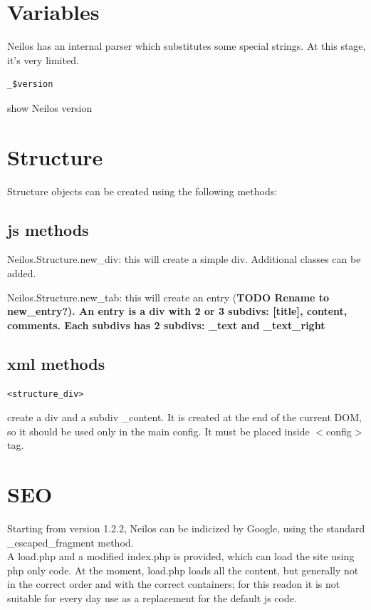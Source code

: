 \documentclass[a4paper,12pt]{article}
\begin{document}
\section{Variables}
Neilos has an internal parser which substitutes some special strings. At this stage, it's very limited.
\begin{list}{-}{}
\item \begin{verbatim}
_$version
\end{verbatim}
show Neilos version
\end{list}
\normalsize
\section{Structure}
Structure objects can be created using the following methods:
\subsection{js methods}
\begin{list}{-}{}
 \item Neilos.Structure.new\_div: this will create a simple div. Additional classes can be added.
\item Neilos.Structure.new\_tab: this will create an entry (\bfseries{TODO} \normalfont Rename to new\_entry?). An entry is a div with 2 or 3 subdivs: [title], content, comments. Each subdivs has 2 subdivs: \_text and \_text\_right
\end{list}
\subsection{xml methods}
\begin{list}{-}{}
  \item \begin{verbatim}
<structure_div>         
        \end{verbatim}
create a div and a subdiv \_content. It is created at the end of the current DOM, so it should be used only in the main config. It must be placed inside $<$config$>$ tag.
\end{list}

\section{SEO}
Starting from version 1.2.2, Neilos can be indicized by Google, using the standard \_escaped\_fragment method.\\
A load.php and a modified index.php is provided, which can load the site using php only code.
At the moment, load.php loads all the content, but generally not in the correct order and with the correct containers; for this readon it is not suitable for every day use as a replacement for the default js code.
\end{document}
